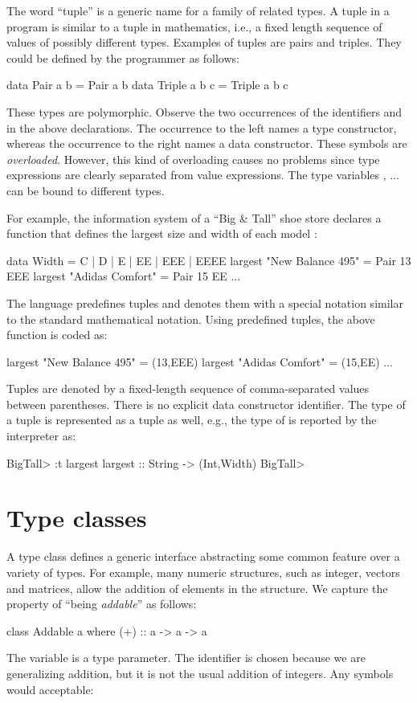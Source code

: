 The word ``tuple'' is a generic name
for a family of related types.
A tuple in a program is similar to
a tuple in mathematics, i.e., a fixed
length sequence of values of possibly different types.
Examples of tuples are pairs and triples.
They could be defined by the programmer as follows:
%
\begin{prog}
data Pair a b = Pair a b
data Triple a b c = Triple a b c
\end{prog}
%
These types are polymorphic.  Observe the two occurrences of
the identifiers  and  in the above declarations.
The occurrence to the left names a type constructor,
whereas the occurrence to the right names a data constructor.
These symbols are \emph{overloaded}.
However, this kind of overloading causes no problems since
type expressions are clearly separated from value expressions.
The type variables , $\ldots$ can be bound
to different types.

For example, the information system of a ``Big \& Tall'' shoe store
declares a function that defines the largest size and width of each model
:
%
\begin{prog}
data Width = C | D | E | EE | EEE | EEEE
largest "New Balance 495" = Pair 13 EEE
largest "Adidas Comfort"  = Pair 15 EE
...
\end{prog}
%
The language predefines tuples and denotes them with a special
notation similar to the standard mathematical notation.
Using predefined tuples, the above function is coded as:
%
\begin{prog}
largest "New Balance 495" = (13,EEE)
largest "Adidas Comfort"  = (15,EE)
...
\end{prog}
%
Tuples are denoted by a fixed-length sequence of comma-separated
values between parentheses.
There is no explicit data constructor identifier.
The type of a tuple is represented
as a tuple as well, e.g., the type of 
is reported by the interpreter as:
%
\begin{prog}
BigTall> :t largest
largest :: String -> (Int,Width)
BigTall> 
\end{prog}
%

\section{Type classes}
\label{Type classes}


A type class defines a generic interface abstracting
some common feature over a variety of types.
For example, many numeric structures, such as integer,
vectors and matrices, allow the addition of elements in the structure.
We capture the property of ``being \emph{addable}'' as follows:
%
\begin{prog}
class Addable a where
  (+) :: a ->  a  -> a
\end{prog}
%
The variable  is a type parameter.
The identifier \ccode{+} is chosen because we are generalizing
addition, but it is not the usual addition of integers.
Any symbols would acceptable:

